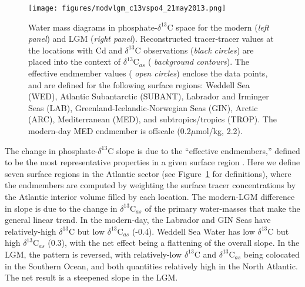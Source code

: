 \documentclass[agums]{aguplus}  %
\begin{document}
\begin{figure}
    \label{fig:watermasses}
     \texttt{[image: figures/modvlgm\_c13vspo4\_21may2013.png]}
     \caption{Water mass diagrams in phosphate-$\delta^{13}$C space
       for the modern ({\it left panel}) and LGM ({\it right panel}).
       Reconstructed tracer-tracer values at the locations with Cd and $\delta^{13}$C observations ({\it black circles}) are
       placed into the context of $\delta^{13}$C$_{as}$ ({\it
         background contours}). The effective endmember values ({\it
         open circles}) enclose
       the data points, and are defined for the following surface
       regions: Weddell Sea (WED), Atlantic Subantarctic (SUBANT),
       Labrador and Irminger Seas (LAB), Greenland-Icelandic-Norwegian
     Seas (GIN), Arctic (ARC), Mediterranean (MED), and
     subtropics/tropics (TROP). The modern-day MED endmember is offscale
     (0.2$\mu$mol/kg, 2.2\permil).}
      \label{fig:watermasses} 
\end{figure}


The change in phosphate-$\delta^{13}$C slope is due to the
``effective endmembers,'' defined to be the most representative
properties in a given surface region
\citep{Gebbie-Huybers-2011:How-is-the-ocean}.  Here we define seven
surface regions in the Atlantic sector (see
Figure~\ref{fig:watermasses} for definitions), where the endmembers
are computed by weighting the surface tracer concentrations by the
Atlantic interior volume filled by each location. The modern-LGM
difference in slope is due to the change in $\delta^{13}$C$_{as}$ of
the primary water-masses that make the general linear trend.
In the modern-day, the Labrador and GIN Seas have relatively-high
$\delta^{13}$C but low $\delta^{13}$C$_{as}$ (-0.4\permil). Weddell
Sea Water has low $\delta^{13}$C but high $\delta^{13}$C$_{as}$
(0.3\permil), with the net effect being a flattening of the overall
slope. In the LGM, the pattern is reversed, with relatively-low
$\delta^{13}$C and $\delta^{13}$C$_{as}$ being colocated in the
Southern Ocean, and both quantities relatively high in the North
Atlantic. The net result is a steepened slope in the LGM. 

\end{document}
